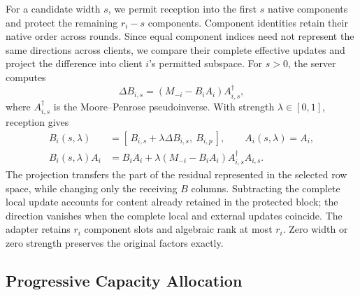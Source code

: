 For a candidate width $s$, we permit reception into the first $s$ native components and protect the remaining $r_i-s$ components.
Component identities retain their native order across rounds.
Since equal component indices need not represent the same directions across clients, we compare their complete effective updates and project the difference into client $i$'s permitted subspace.
For $s>0$, the server computes
\begin{equation}
    \Delta B_{i,s}=(M_{-i}-B_iA_i)A_{i,s}^{\dagger},
    \label{equ:acl-direction}
\end{equation}
where $A_{i,s}^{\dagger}$ is the Moore--Penrose pseudoinverse.
With strength $\lambda\in[0,1]$, reception gives
\begin{equation}
    \begin{aligned}
        B_i(s,\lambda)&=[\,B_{i,s}+\lambda\Delta B_{i,s},\ B_{i,p}\,],
        \qquad A_i(s,\lambda)=A_i,\\
        B_i(s,\lambda)A_i
        &=B_iA_i+\lambda(M_{-i}-B_iA_i)A_{i,s}^{\dagger}A_{i,s}.
    \end{aligned}
    \label{equ:acl-receive}
\end{equation}
The projection transfers the part of the residual represented in the selected row space, while changing only the receiving $B$ columns.
Subtracting the complete local update accounts for content already retained in the protected block; the direction vanishes when the complete local and external updates coincide.
The adapter retains $r_i$ component slots and algebraic rank at most $r_i$.
Zero width or zero strength preserves the original factors exactly.


\subsection{Progressive Capacity Allocation}
\label{sec:method:allocation}

